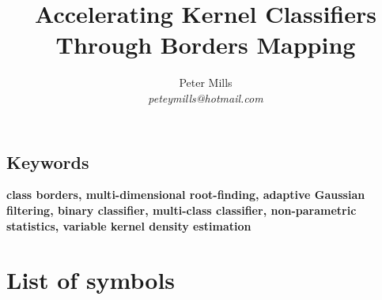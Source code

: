 \documentclass[11pt]{article}
\begin{document}
\title{Accelerating Kernel Classifiers Through Borders Mapping}

\author{Peter Mills\\\textit{peteymills@hotmail.com}}

\maketitle



\begin{abstract}
	
\end{abstract}

\subsection*{Keywords}
\textbf{class borders,
multi-dimensional root-finding,
adaptive Gaussian filtering,
binary classifier,
multi-class classifier, 
non-parametric statistics, 
variable kernel density estimation}

\tableofcontents

\section*{List of symbols}


{\small
  
}



\appendix



\newpage



\end{document}
